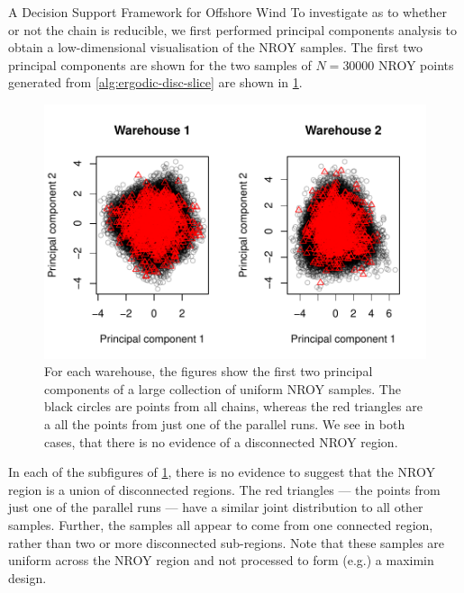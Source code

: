\begin{chapter}{A Decision Support Framework for Offshore Wind \label{Ch:ds-for-ow}}
To investigate as to whether or not the chain is reducible, we first performed principal components analysis to obtain a low-dimensional visualisation of the NROY samples. The first two principal components are shown for the two samples of $N = 30000$ NROY points generated from \cref{alg:ergodic-disc-slice} are shown in \cref{Fig:check-ergodic}.

\begin{figure}
  \includegraphics[width = \textwidth]{fig-ds/check-ergodic.pdf}
  \caption{For each warehouse, the figures show the first two principal components of a large collection of uniform NROY samples. The black circles are points from all chains, whereas the red triangles are a all the points from just one of the parallel runs. We see in both cases, that there is no evidence of a disconnected NROY region.\label{Fig:check-ergodic}}
\end{figure}

In each of the subfigures of \cref{Fig:check-ergodic}, there is no evidence to suggest that the NROY region is a union of disconnected regions. The red triangles --- the points from just one of the parallel runs --- have a similar joint distribution to all other samples. Further, the samples all appear to come from one connected region, rather than two or more disconnected sub-regions. Note that these samples are uniform across the NROY region and not processed to form (e.g.) a maximin design.


\end{chapter}
